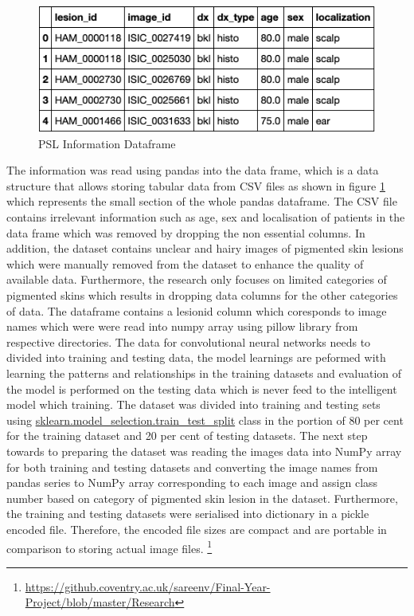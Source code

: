 \begin{figure} [!htp]
    \includegraphics[width=\textwidth]{Images/datae.png}
    \caption{PSL Information Dataframe}
    \label{fig:pandasTop}
\end{figure}

The information was read using pandas into the data frame, 
which is a data structure that allows storing tabular data from CSV files as shown in 
figure \ref{fig:pandasTop} which represents the small section of the whole pandas dataframe. The CSV file contains irrelevant information such as age, sex and localisation 
of patients in the data frame which was removed by dropping the non essential columns.
In addition, the dataset contains unclear and hairy images of pigmented skin lesions which were manually 
removed from the dataset to enhance the quality of available data.
Furthermore, the research only focuses on limited categories of 
pigmented skins which results in dropping data columns for the other categories 
of data. The dataframe contains a lesionid column which coresponds
to image names which were were read into numpy array using pillow library from respective directories.
The data for convolutional neural networks needs to divided into training and testing data, the model learnings
are peformed with learning the patterns and relationships in the training datasets and evaluation of the 
model is performed on the testing data which is never feed to the intelligent model which training.
The dataset was divided into training and testing sets using \url{sklearn.model_selection.train_test_split} class in the portion of 80 per cent for 
the training dataset and 20 per cent of testing datasets. The next step towards to preparing the dataset was reading the images data into NumPy 
array for both training and testing datasets and converting the image names from pandas series to NumPy array corresponding to each image and assign class number 
based on category of pigmented skin lesion in the dataset. Furthermore, the training and testing datasets were serialised into 
dictionary in a pickle encoded file. Therefore, the encoded file sizes are compact and are portable
in comparison to storing actual image files. \footnote{\url{https://github.coventry.ac.uk/sareenv/Final-Year-Project/blob/master/Research}}
\pagebreak
